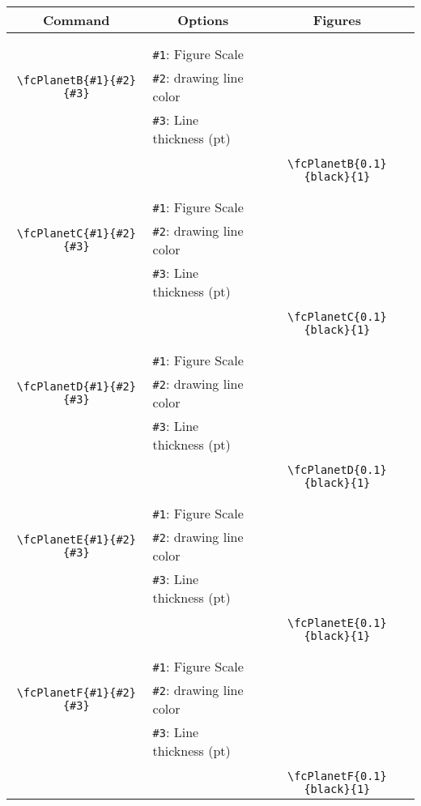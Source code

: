 \documentclass[x11names]{article}
\begin{document}
\begin{table}[H]\centering\begin{tabular}{|c|l|c|}\hline {\bf Command}& \multicolumn{1}{c|}{{\bf Options}} & {\bf Figures}\\  \hline	&&\multirow{5}{*}{\fcPlanetB{0.1}{black}{1}}\\	&&\\	&\verb|#1|: Figure Scale &\\	\verb|\fcPlanetB{#1}{#2}{#3}|&	\verb|#2|: drawing line color &\\	&\verb|#3|: Line thickness (pt) &\\ &&\\&&	\verb|\fcPlanetB{0.1}{black}{1}|\\\hline 	
	&&\multirow{5}{*}{\fcPlanetC{0.1}{black}{1}}\\	&&\\	&\verb|#1|: Figure Scale &\\	\verb|\fcPlanetC{#1}{#2}{#3}|&	\verb|#2|: drawing line color &\\	&\verb|#3|: Line thickness (pt) &\\ &&\\&&	\verb|\fcPlanetC{0.1}{black}{1}|\\\hline 	
	&&\multirow{5}{*}{\fcPlanetD{0.1}{black}{1}}\\	&&\\	&\verb|#1|: Figure Scale &\\	\verb|\fcPlanetD{#1}{#2}{#3}|&	\verb|#2|: drawing line color &\\	&\verb|#3|: Line thickness (pt) &\\ &&\\&&	\verb|\fcPlanetD{0.1}{black}{1}|\\\hline 	
	&&\multirow{5}{*}{\fcPlanetE{0.1}{black}{1}}\\	&&\\	&\verb|#1|: Figure Scale &\\	\verb|\fcPlanetE{#1}{#2}{#3}|&	\verb|#2|: drawing line color &\\	&\verb|#3|: Line thickness (pt) &\\ &&\\&&	\verb|\fcPlanetE{0.1}{black}{1}|\\\hline 	
	&&\multirow{5}{*}{\fcPlanetF{0.1}{black}{1}}\\	&&\\	&\verb|#1|: Figure Scale &\\	\verb|\fcPlanetF{#1}{#2}{#3}|&	\verb|#2|: drawing line color &\\	&\verb|#3|: Line thickness (pt) &\\ &&\\&&	\verb|\fcPlanetF{0.1}{black}{1}|\\\hline 	

\end{tabular}
\end{table}
\end{document}
